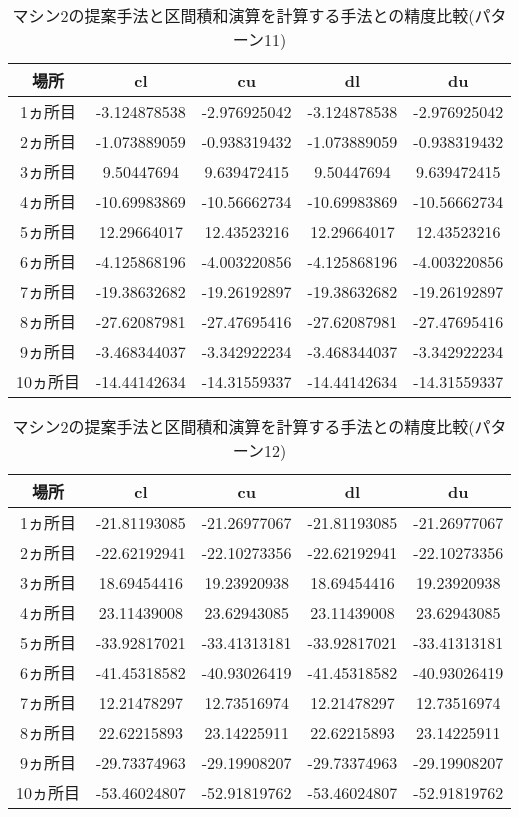 \documentclass[11pt,a4paper]{jsreport}
\theoremstyle{definition}
\begin{document}
\begin{table}[H]
\centering
\begin{tabular}{|c|c|c|c|c|}
\hline
場所 & cl & cu & dl & du \\ \hline
1ヵ所目 & -3.124878538 & -2.976925042 & -3.124878538 & -2.976925042 \\ \hline
2ヵ所目 & -1.073889059 & -0.938319432 & -1.073889059 & -0.938319432 \\ \hline
3ヵ所目 & 9.50447694 & 9.639472415 & 9.50447694 & 9.639472415 \\ \hline
4ヵ所目 & -10.69983869 & -10.56662734 & -10.69983869 & -10.56662734 \\ \hline
5ヵ所目 & 12.29664017 & 12.43523216 & 12.29664017 & 12.43523216 \\ \hline
6ヵ所目 & -4.125868196 & -4.003220856 & -4.125868196 & -4.003220856 \\ \hline
7ヵ所目 & -19.38632682 & -19.26192897 & -19.38632682 & -19.26192897 \\ \hline
8ヵ所目 & -27.62087981 & -27.47695416 & -27.62087981 & -27.47695416 \\ \hline
9ヵ所目 & -3.468344037 & -3.342922234 & -3.468344037 & -3.342922234 \\ \hline
10ヵ所目 & -14.44142634 & -14.31559337 & -14.44142634 & -14.31559337 \\ \hline
\end{tabular}
\caption{マシン2の提案手法と区間積和演算を計算する手法との精度比較(パターン11)}
\end{table}

\begin{table}[H]
\centering
\begin{tabular}{|c|c|c|c|c|}
\hline
場所 & cl & cu & dl & du \\ \hline
1ヵ所目 & -21.81193085 & -21.26977067 & -21.81193085 & -21.26977067 \\ \hline
2ヵ所目 & -22.62192941 & -22.10273356 & -22.62192941 & -22.10273356 \\ \hline
3ヵ所目 & 18.69454416 & 19.23920938 & 18.69454416 & 19.23920938 \\ \hline
4ヵ所目 & 23.11439008 & 23.62943085 & 23.11439008 & 23.62943085 \\ \hline
5ヵ所目 & -33.92817021 & -33.41313181 & -33.92817021 & -33.41313181 \\ \hline
6ヵ所目 & -41.45318582 & -40.93026419 & -41.45318582 & -40.93026419 \\ \hline
7ヵ所目 & 12.21478297 & 12.73516974 & 12.21478297 & 12.73516974 \\ \hline
8ヵ所目 & 22.62215893 & 23.14225911 & 22.62215893 & 23.14225911 \\ \hline
9ヵ所目 & -29.73374963 & -29.19908207 & -29.73374963 & -29.19908207 \\ \hline
10ヵ所目 & -53.46024807 & -52.91819762 & -53.46024807 & -52.91819762 \\ \hline
\end{tabular}
\caption{マシン2の提案手法と区間積和演算を計算する手法との精度比較(パターン12)}
\end{table}
\end{document}
